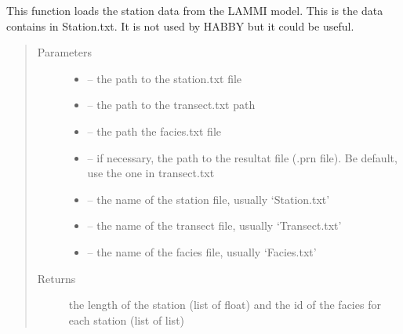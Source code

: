 \documentclass[letterpaper,10pt,english]{sphinxmanual}
\begin{document}
\begin{fulllineitems}
\label{\detokenize{index:src.lammi.load_station}}
This function loads the station data from the LAMMI model. This is the data contains in Station.txt. It is not used
by HABBY but it could be useful.
\begin{quote}\begin{description}
\item[{Parameters}] \leavevmode\begin{itemize}
\item {} 
 -- the path to the station.txt file

\item {} 
 -- the path to the transect.txt path

\item {} 
 -- the path the facies.txt file

\item {} 
 -- if necessary, the path to the resultat file (.prn file). Be default, use the one in transect.txt

\item {} 
 -- the name of the station file, usually `Station.txt'

\item {} 
 -- the name of the transect file, usually `Transect.txt'

\item {} 
 -- the name of the facies file, usually `Facies.txt'

\end{itemize}

\item[{Returns}] \leavevmode
the length of the station (list of float) and the id of the facies for each station (list of list)

\end{description}\end{quote}

\end{fulllineitems}

\end{document}
